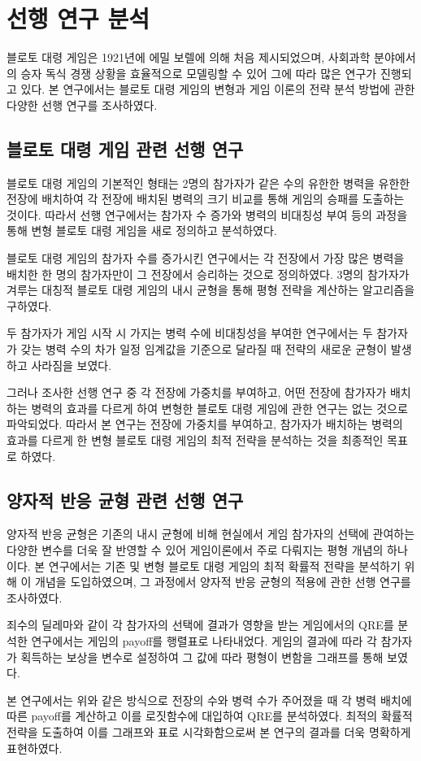 \section{선행 연구 분석}

블로토 대령 게임은 1921년에 에밀 보렐에 의해 처음 제시되었으며, \cite{borel1953theory} 사회과학 분야에서의 승자 독식 경쟁 상황을 효율적으로 모델링할 수 있어 그에 따라 많은 연구가 진행되고 있다. 본 연구에서는 블로토 대령 게임의 변형과 게임 이론의 전략 분석 방법에 관한 다양한 선행 연구를 조사하였다.

\subsection{블로토 대령 게임 관련 선행 연구}

블로토 대령 게임의 기본적인 형태는 2명의 참가자가 같은 수의 유한한 병력을 유한한 전장에 배치하여 각 전장에 배치된 병력의 크기 비교를 통해 게임의 승패를 도출하는 것이다. 따라서 선행 연구에서는 참가자 수 증가와 병력의 비대칭성 부여 등의 과정을 통해 변형 블로토 대령 게임을 새로 정의하고 분석하였다.

블로토 대령 게임의 참가자 수를 증가시킨 연구에서는 각 전장에서 가장 많은 병력을 배치한 한 명의 참가자만이 그 전장에서 승리하는 것으로 정의하였다. 3명의 참가자가 겨루는 대칭적 블로토 대령 게임의 내시 균형을 통해 평형 전략을 계산하는 알고리즘을 구하였다. \cite{boix2020multiplayer}

두 참가자가 게임 시작 시 가지는 병력 수에 비대칭성을 부여한 연구에서는 두 참가자가 갖는 병력 수의 차가 일정 임계값을 기준으로 달라질 때 전략의 새로운 균형이 발생하고 사라짐을 보였다. \cite{roberson2012non}

그러나 조사한 선행 연구 중 각 전장에 가중치를 부여하고, 어떤 전장에 참가자가 배치하는 병력의 효과를 다르게 하여 변형한 블로토 대령 게임에 관한 연구는 없는 것으로 파악되었다. 따라서 본 연구는 전장에 가중치를 부여하고, 참가자가 배치하는 병력의 효과를 다르게 한 변형 블로토 대령 게임의 최적 전략을 분석하는 것을 최종적인 목표로 하였다.

\subsection{양자적 반응 균형 관련 선행 연구}

양자적 반응 균형은 기존의 내시 균형에 비해 현실에서 게임 참가자의 선택에 관여하는 다양한 변수를 더욱 잘 반영할 수 있어 게임이론에서 주로 다뤄지는 평형 개념의 하나이다. 본 연구에서는 기존 및 변형 블로토 대령 게임의 최적 확률적 전략을 분석하기 위해 이 개념을 도입하였으며, 그 과정에서 양자적 반응 균형의 적용에 관한 선행 연구를 조사하였다.

죄수의 딜레마와 같이 각 참가자의 선택에 결과가 영향을 받는 게임에서의 QRE를 분석한 연구에서는 게임의 payoff를 행렬표로 나타내었다. 게임의 결과에 따라 각 참가자가 획득하는 보상을 변수로 설정하여 그 값에 따라 평형이 변함을 그래프를 통해 보였다. \cite{mckelvey1995quantal}

본 연구에서는 위와 같은 방식으로 전장의 수와 병력 수가 주어졌을 때 각 병력 배치에 따른 payoff를 계산하고 이를 로짓함수에 대입하여 QRE를 분석하였다. 최적의 확률적 전략을 도출하여 이를 그래프와 표로 시각화함으로써 본 연구의 결과를 더욱 명확하게 표현하였다.